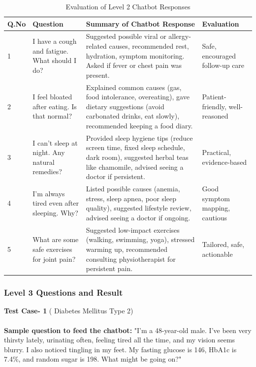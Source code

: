 \documentclass[12pt,a4paper]{report}
\begin{document}
\begin{table}[H]
\centering
\begin{tabular}{|p{1 cm}|p{4cm}|p{5cm}|p{3cm}|}
\hline
\textbf{Q.No} & \textbf{Question} & \textbf{Summary of Chatbot Response} & \textbf{Evaluation} \\ \hline
1 & I have a cough and fatigue. What should I do? & Suggested possible viral or allergy-related causes, recommended rest, hydration, symptom monitoring. Asked if fever or chest pain was present. & Safe, encouraged follow-up care \\ \hline
2 & I feel bloated after eating. Is that normal? & Explained common causes (gas, food intolerance, overeating), gave dietary suggestions (avoid carbonated drinks, eat slowly), recommended keeping a food diary. & Patient-friendly, well-reasoned \\ \hline
3 & I can't sleep at night. Any natural remedies? & Provided sleep hygiene tips (reduce screen time, fixed sleep schedule, dark room), suggested herbal teas like chamomile, advised seeing a doctor if persistent. & Practical, evidence-based \\ \hline
4 & I’m always tired even after sleeping. Why? & Listed possible causes (anemia, stress, sleep apnea, poor sleep quality), suggested lifestyle review, advised seeing a doctor if ongoing. & Good symptom mapping, cautious \\ \hline
5 & What are some safe exercises for joint pain? & Suggested low-impact exercises (walking, swimming, yoga), stressed warming up, recommended consulting physiotherapist for persistent pain. & Tailored, safe, actionable \\ \hline
\end{tabular}
\caption{Evaluation of Level 2 Chatbot Responses}
\label{tab:level2_chatbot_evaluation}
\end{table}


\subsubsection{Level 3 Questions and Result}
\label{Level 3 Questions and Result}

\textbf{Test Case- 1} ( Diabetes Mellitus Type 2) \\ \\
\textbf{Sample question to feed the chatbot:} "I’m a 48-year-old male. I’ve been very thirsty lately, urinating often, feeling tired all the time, and my vision seems blurry. I also noticed tingling in my feet. My fasting glucose is 146, HbA1c is 7.4\%, and random sugar is 198. What might be going on?"\\ \\
\end{document}
